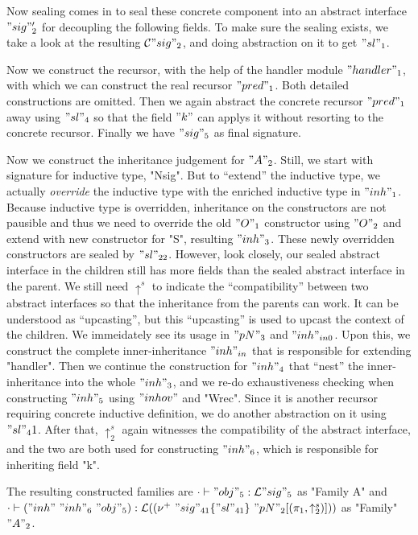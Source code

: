 Now sealing comes in to seal these concrete component into an abstract
interface $"sig"_2'$ for decoupling the following fields. To make sure
the sealing exists, we take a look at the resulting ${\mathcal{C}} "sig"_2$, and
doing abstraction on it to get $"sl"_1$. 

Now we construct the recursor, with the help of the handler module
$"handler"_1$, with which we can construct the real recursor $"pred"_1$.
Both detailed constructions are omitted. Then we again abstract the
concrete recursor $"pred"_1$ away using $"sl"_4$ so that the field $"k"$
can applys it without resorting to the concrete recursor. Finally we
have $"sig"_5$ as final signature. 

Now we construct the inheritance judgement for $"A"_2$. Still, we start
with signature for inductive type, "Nsig". But to ``extend'' the
inductive type, we actually \textit{override} the inductive type with
the enriched inductive type in $"inh"_1$. Because inductive type is
overridden, inheritance on the constructors are not pausible and thus we
need to override the old $"O"_1$ constructor using $"O"_2$ and extend
with new constructor for "S", resulting $"inh"_3$. These newly
overridden constructors are sealed by $"sl"_{22}$. However, look
closely, our sealed abstract interface in the children still has more
fields than the sealed abstract interface in the parent. We still need
$\uparrow^s$ to indicate the ``compatibility'' between two abstract
interfaces so that the inheritance from the parents can work. It can be
understood as ``upcasting'', but this ``upcasting'' is used to upcast
the context of the children. We immeidately see its usage in $"pN"_3$
and $"inh"_{in0}$. Upon this, we construct the complete
inner-inheritance $"inh"_{in}$ that is responsible for extending
"handler". Then we continue the construction for $"inh"_4$ that ``nest''
the inner-inheritance into the whole $"inh"_3$, and we re-do
exhaustiveness checking when constructing $"inh"_5$ using $"inhov"$ and
"Wrec". Since it is another recursor requiring concrete inductive
definition, we do another abstraction on it using $"sl"_41$. After that,
$\uparrow^s_2$ again witnesses the compatibility of the abstract
interface, and the two are both used for constructing $"inh"_6$, which
is responsible for inheriting field "k". 

The resulting constructed families are
${ {\cdot} \vdash {"obj"_5} : {{\mathcal{L}}"sig"_5} }$ as "Family A" and \\
${ {\cdot} \vdash {("inh"~"inh"_6~"obj"_5)} : {{\mathcal{L}}((\nu^+ \ "sig"_{41}
\{"sl"_{41}\} \ "pN"_2[(\pi_1, \uparrow^s_2)]))} }$ as "Family" $"A"_2$.


